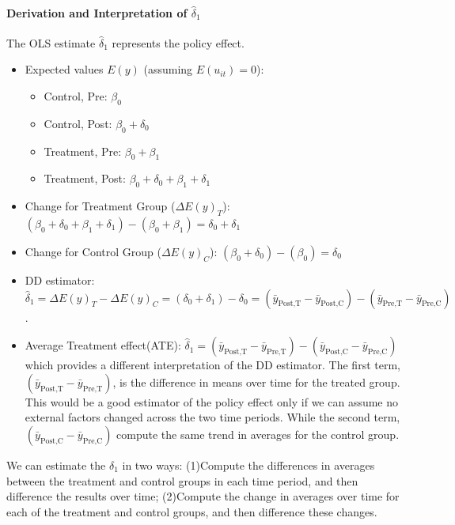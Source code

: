\documentclass[a4paper, 10pt]{article}
\theoremstyle{definition}	%
\begin{document}
\paragraph{Derivation and Interpretation of \(\hat{\delta}_1\)} %
The OLS estimate \(\hat{\delta}_1\) represents the policy effect.
\begin{itemize}
    \item Expected values \(E(y)\) (assuming \(E(u_{it})=0\)):
    \begin{itemize}
        \item Control, Pre: \(\beta_0\)
        \item Control, Post: \(\beta_0 + \delta_0\)
        \item Treatment, Pre: \(\beta_0 + \beta_1\)
        \item Treatment, Post: \(\beta_0 + \delta_0 + \beta_1 + \delta_1\)
    \end{itemize}
    \item Change for Treatment Group (\(\Delta E(y)_T\)): \((\beta_0 + \delta_0 + \beta_1 + \delta_1) - (\beta_0 + \beta_1) = \delta_0 + \delta_1\)
    \item Change for Control Group (\(\Delta E(y)_C\)): \((\beta_0 + \delta_0) - (\beta_0) = \delta_0\)
    \item DD estimator: \(\hat{\delta}_1 = \Delta E(y)_T - \Delta E(y)_C = (\delta_0 + \delta_1) - \delta_0 = (\bar{y}_{\text{Post,T}} - \bar{y}_{\text{Post,C}}) - (\bar{y}_{\text{Pre,T}} - \bar{y}_{\text{Pre,C}}) \).
    \item Average Treatment effect(ATE): \(\hat{\delta}_1 = (\bar{y}_{\text{Post,T}} - \bar{y}_{\text{Pre,T}}) - (\bar{y}_{\text{Post,C}} - \bar{y}_{\text{Pre,C}})\) which  provides a different interpretation of the DD estimator. The first term, $(\bar{y}_{\text{Post,T}} -\bar{y}_{\text{Pre,T}})$, is the difference in means over time for the treated group. This would be a good estimator of the policy effect only if we can assume no external factors changed across the two time periods. While the second term, $(\bar{y}_{\text{Post,C}} - \bar{y}_{\text{Pre,C}})$ compute the same trend in averages for the control group.
\end{itemize}

We can estimate the $\delta_1$ in two ways: (1)Compute the differences in averages between the treatment and control groups in each time period, and then difference the results over time; (2)Compute the change in averages over time for each of the treatment and control groups, and then difference these changes.
\end{document}
